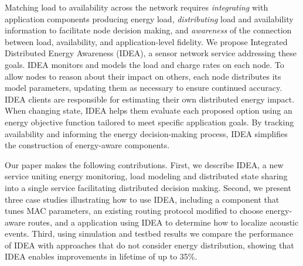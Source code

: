Matching load to availability across the network requires \emph{integrating}
with application components producing energy load, \emph{distributing}
load and availability information to facilitate node decision making, and
\emph{awareness} of the connection between load, availability, and
application-level fidelity. We propose Integrated Distributed Energy
Awareness (IDEA), a sensor network service addressing these goals. IDEA
monitors and models the load and charge rates on each node.  To allow nodes
to reason about their impact on others, each node distributes its model
parameters, updating them as necessary to ensure continued accuracy.  IDEA
clients are responsible for estimating their own distributed energy
impact. When changing state, IDEA helps them evaluate each
proposed option using an energy objective function tailored to meet
specific application goals. By tracking availability and informing the energy
decision-making process, IDEA simplifies the construction of energy-aware
components.

Our paper makes the following contributions. First, we describe IDEA, a new
service uniting energy monitoring, load modeling and distributed state
sharing into a single service facilitating distributed decision making.
Second, we present three case studies illustrating how to use IDEA, including
a component that tunes MAC parameters, an existing routing protocol modified
to choose energy-aware routes, and a application using IDEA to determine how
to localize acoustic events.  Third, using simulation and testbed results we
compare the performance of IDEA with approaches that do not consider energy
distribution, showing that IDEA enables improvements in lifetime of up to
35\%.

